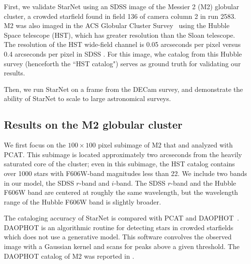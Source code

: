 First, we validate StarNet using an SDSS image of the Messier 2 (M2) globular cluster,
a crowded starfield found in field 136 of camera column 2 in run 2583.
M2 was also imaged in the ACS Globular Cluster Survey~\citep{Sarajedini_2007}
using the Hubble Space telescope (HST),
which has greater resolution than the Sloan telescope.
The resolution of the HST wide-field channel is 0.05 arcseconds per pixel versus
0.4 arcseconds per pixel in SDSS \citep{hubble_about, sdss_about}.
For this image, whe catalog from this Hubble survey (henceforth the ``HST catalog")
serves as ground truth for validating our results.

Then, we run StarNet on a frame from the DECam survey,
and demonstrate the ability of StarNet to scale to large astronomical surveys.

\subsection{Results on the M2 globular cluster}
\label{sec:results_on_m2}

We first focus on the $100 \times 100$ pixel subimage of M2 that
\cite{Portillo_2017} and \cite{Feder_2019} analyzed with PCAT.
This subimage is located approximately two arcseconds from the heavily saturated core of the cluster;
even in this subimage, the HST catalog contains over 1000 stars with F606W-band magnitudes less than 22.
We include two bands in our model, the SDSS $r$-band and $i$-band.
The SDSS $r$-band and the Hubble F606W band are centered at roughly the same wavelength,
but the wavelength range of the Hubble F606W band is slightly broader.

The cataloging accuracy of StarNet is compared with PCAT and DAOPHOT~\citep{stetson2987daophot}.
DAOPHOT is an algorithmic routine for detecting stars in crowded starfields which does not use a generative model.
This software convolves the observed image with a Gaussian kernel and scans for peaks above a given threshold.
The DAOPHOT catalog of M2 was reported in \cite{An_2008_m2}.



